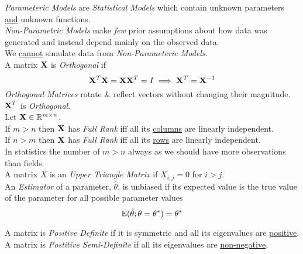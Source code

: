 \documentclass[11pt,a4paper]{article}
\begin{document}
\textit{Parameteric Models} are \textit{Statistical Models} which contain unknown parameters \underline{and} unknown functions.\\

\textit{Non-Parametric Models} make \textit{few} prior assumptions about how data was generated and instead depend mainly on the observed data.\\
We \underline{cannot} simulate data from \textit{Non-Parameteric Models}.\\

A matrix $\textbf{X}$ is \textit{Orthogonal} if
$$\textbf{X}^T\textbf{X}=\textbf{X}\textbf{X}^T=I\implies\textbf{X}^T=\textbf{X}^{-1}$$
\textit{Orthogonal Matrices} rotate \& reflect vectors without changing their magnitude.\\
\nb $\textbf{X}^T$ is \textit{Orthogonal}.\\

Let $\textbf{X}\in\mathbb{R}^{m\times n}$.\\
If $m>n$ then $\textbf{X}$ has \textit{Full Rank} iff all its \underline{columns} are linearly independent.\\
If $n>m$ then $\textbf{X}$ has \textit{Full Rank} iff all its \underline{rows} are linearly independent.\\
\nb In statistics the number of $m>n$ always as we should have more observations than fields.\\

A matrix $X$ is an \textit{Upper Triangle Matrix} if $X_{i,j}=0$ for $i>j$.\\

An \textit{Estimator} of a parameter, $\hat\theta$, is unbiased if its expected value is the true value of the parameter for all possible parameter values
$$\mathbb{E}(\hat\theta;\theta=\theta^*)=\theta^*$$


A matrix is \textit{Positive Definite} if it is symmetric and all its eigenvalues are \underline{positive}.\\

A matrix is \textit{Postitive Semi-Definite} if all its eigenvalues are \underline{non-negative}.
\end{document}

